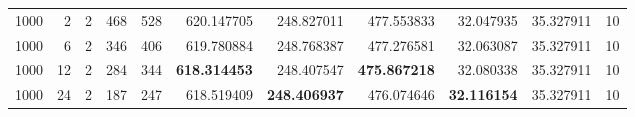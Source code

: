 \begin{table}
\begin{tabular}{rrrrrrrrrrr}
1000 & 2 & 2 & 468 & 528 & 620.147705 & 248.827011 & 477.553833 & 32.047935 & 35.327911 & 10 \\
1000 & 6 & 2 & 346 & 406 & 619.780884 & 248.768387 & 477.276581 & 32.063087 & 35.327911 & 10 \\
1000 & 12 & 2 & 284 & 344 & \textbf{618.314453} & 248.407547 & \textbf{475.867218} & 32.080338 & 35.327911 & 10 \\
1000 & 24 & 2 & 187 & 247 & 618.519409 & \textbf{248.406937} & 476.074646 & \textbf{32.116154} & 35.327911 & 10 \\
\bottomrule
\end{tabular}
\end{table}

